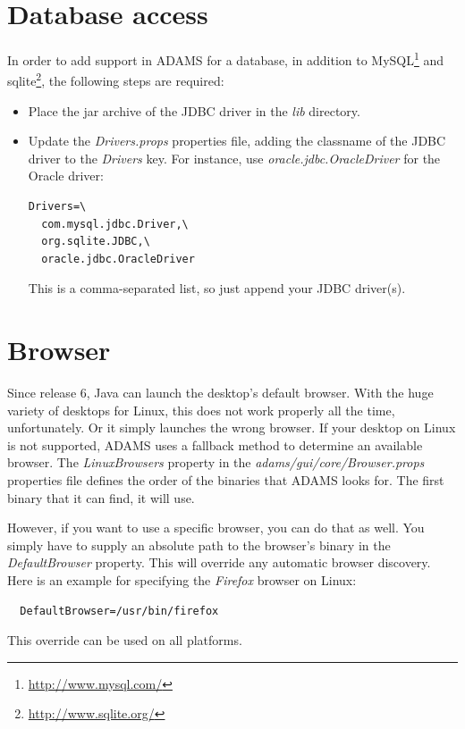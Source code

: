 \section{Database access}
\label{databaseaccess}
In order to add support in ADAMS for a database, in addition to MySQL\footnote{\url{http://www.mysql.com/}{}} 
and sqlite\footnote{\url{http://www.sqlite.org/}{}}, the following steps
are required:
\begin{itemize}
	\item Place the jar archive of the JDBC driver in the \textit{lib} directory.
	\item Update the \textit{Drivers.props} properties file, adding
	the classname of the JDBC driver to the \textit{Drivers} key. For instance,
	use \textit{oracle.jdbc.OracleDriver} for the Oracle driver: \\
\begin{verbatim}
Drivers=\
  com.mysql.jdbc.Driver,\
  org.sqlite.JDBC,\
  oracle.jdbc.OracleDriver
\end{verbatim}
	This is a comma-separated list, so just append your JDBC driver(s).
\end{itemize}

\section{Browser}
Since release 6, Java can launch the desktop's default browser. With the huge
variety of desktops for Linux, this does not work properly all the time, 
unfortunately. Or it simply launches the wrong browser. If your desktop on 
Linux is not supported, ADAMS uses a fallback method to determine an available browser. 
The \textit{LinuxBrowsers} property in the \textit{adams/gui/core/Browser.props} 
properties file defines the order of the binaries that ADAMS looks for. The first
binary that it can find, it will use.

However, if you want to use a specific browser, you can do that as well.
You simply have to supply an absolute path to the browser's binary in the
\textit{DefaultBrowser} property. This will override any automatic browser 
discovery. Here is an example for specifying the \textit{Firefox} browser on Linux:
\begin{verbatim}
  DefaultBrowser=/usr/bin/firefox
\end{verbatim}
This override can be used on all platforms.
